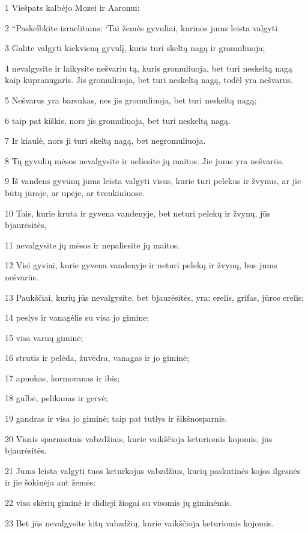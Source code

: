\par 1 Viešpats kalbėjo Mozei ir Aaronui: 
\par 2 “Paskelbkite izraelitams: ‘Tai žemės gyvuliai, kuriuos jums leista valgyti. 
\par 3 Galite valgyti kiekvieną gyvulį, kuris turi skeltą nagą ir gromuliuoja; 
\par 4 nevalgysite ir laikysite nešvariu tą, kuris gromuliuoja, bet turi neskeltą nagą kaip kupranugaris. Jis gromuliuoja, bet turi neskeltą nagą, todėl yra nešvarus. 
\par 5 Nešvarus yra barsukas, nes jis gromuliuoja, bet turi neskeltą nagą; 
\par 6 taip pat kiškis, nors jis gromuliuoja, bet turi neskeltą nagą. 
\par 7 Ir kiaulė, nors ji turi skeltą nagą, bet negromuliuoja. 
\par 8 Tų gyvulių mėsos nevalgysite ir neliesite jų maitos. Jie jums yra nešvarūs. 
\par 9 Iš vandens gyvūnų jums leista valgyti visus, kurie turi pelekus ir žvynus, ar jie būtų jūroje, ar upėje, ar tvenkiniuose. 
\par 10 Tais, kurie kruta ir gyvena vandenyje, bet neturi pelekų ir žvynų, jūs bjaurėsitės, 
\par 11 nevalgysite jų mėsos ir nepaliesite jų maitos. 
\par 12 Visi gyviai, kurie gyvena vandenyje ir neturi pelekų ir žvynų, bus jums nešvarūs. 
\par 13 Paukščiai, kurių jūs nevalgysite, bet bjaurėsitės, yra: erelis, grifas, jūros erelis; 
\par 14 peslys ir vanagėlis su visa jo gimine; 
\par 15 visa varnų giminė; 
\par 16 strutis ir pelėda, žuvėdra, vanagas ir jo giminė; 
\par 17 apuokas, kormoranas ir ibis; 
\par 18 gulbė, pelikanas ir gervė; 
\par 19 gandras ir visa jo giminė; taip pat tutlys ir šikšnosparnis. 
\par 20 Visais sparnuotais vabzdžiais, kurie vaikščioja keturiomis kojomis, jūs bjaurėsitės. 
\par 21 Jums leista valgyti tuos keturkojus vabzdžius, kurių paskutinės kojos ilgesnės ir jie šokinėja ant žemės: 
\par 22 visa skėrių giminė ir didieji žiogai su visomis jų giminėmis. 
\par 23 Bet jūs nevalgysite kitų vabzdžių, kurie vaikščioja keturiomis kojomis. 
